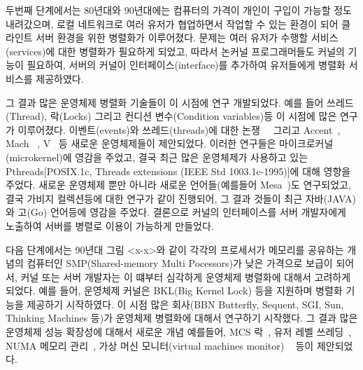 두번째 단계에서는 80년대와 90년대에는 컴퓨터의 가격이 개인이 구입이 가능할 정도 내려갔으며,
 로컬 네트워크로 여러 유저가 
협업하면서 작업할 수 있는 환경이 되어 클라인트 서버 환경을 위한 병렬화가 이루어졌다.
문제는 여러 유저가 수행할 서비스(services)에 대한 병렬화가 필요하게 되었고, 
따라서 논커널 프로그래머들도 커널의 기능이 필요하여, 서버의 커널이 인터페이스(interface)를
 추가하여 유저들에게 병렬화 서비스를 제공하였다. 
 
그 결과 많은 운영체제 병렬화 기술들이 이 시점에 연구 개발되었다. 
예를 들어 쓰레드(Thread), 락(Locks) 그리고 컨디션 변수(Condition variables)등 이 시점에 많은 연구가 
이루어졌다.
이벤트(events)와 쓰레드(threads)에 대한 논쟁~\cite{Ous96}~\cite{vonBehren2003WEB}
그리고 Accent~\cite{Rashid1981ACO},
Mach~\cite{Accetta86mach} , V~\cite{Cheriton1983DVK} 등 새로운 운영체제들이 제안되었다. 
이러한 연구들은 마이크로커널(microkernel)에 영감을 주었고, 결국 최근 많은 운영체제가 사용하고 있는 
Pthreads[POSIX.1c, Threads extensions (IEEE Std 1003.1c-1995)]에 대해 영향을 주었다. 
새로운 운영체제 뿐만 아니라 새로운 언어들(예를들어 Mesa~\cite{Lampson1979EPM})도
 연구되었고, 결국 가비지 컬렉션등에 대한 연구가 같이 진행되어, 그 결과 것들이 최근 자바(JAVA)와 고(Go) 언어등에
 영감을 주었다.
결론으로 커널의 인터페이스를 서버 개발자에게 노출하여 서버를 병렬로 이용이 가능하게 만들었다.

다음 단계에서는 90년대 그림 <x-x>와 같이 각각의 프로세서가 메모리를 공유하는 개념의 컴퓨터인 SMP(Shared-memory Multi
Pocessors)가 낮은 가격으로 보급이 되어서, 커널 또는 서버 개발자는 이 떄부터 심각하게 운영체제 병렬화에 대해서 고려하게 되었다.
예를 들어, 운영체제 커널은 BKL(Big Kernel Lock) 등을 지원하며 병렬화 기능을 제공하기 시작하였다.
이 시점 많은 회사(BBN Butterfly, Sequent, SGI, Sun, Thinking Machines 등)가 운영체제 병렬화에 대해서 
연구하기 시작했다.
그 결과 많은 운영체제 성능 확장성에 대해서 새로운 개념 예를들어, 
MCS 락~\cite{MellorCrummey1991MCS}, 유저 레벨 쓰레딩~\cite{Marsh1991FUT},
 NUMA 메모리 관리~\cite{Bolosky1991NPR}, 가상 머신 모니터(virtual machines monitor)
~\cite{Bugnion1997DRC} 등이 제안되었다.  


